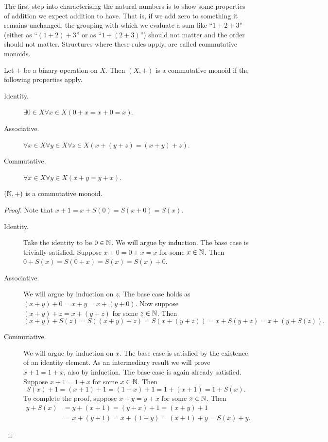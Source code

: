 \documentclass[../main.tex]{subfiles}
\begin{document}
The first step into characterising the natural numbers is to show some properties of addition we expect addition to have. That is, if we add zero to something it remains unchanged, the grouping with which we evaluate a sum like ``$1+2+3$'' (either as ``$(1+2)+3$'' or as ``$1+(2+3)$'') should not matter and the order should not matter. Structures where these rules apply, are called commutative monoids.
\begin{definition}
    Let $+$ be a binary operation on $X$. Then $(X,+)$ is a commutative monoid if the following properties apply.
    \begin{description}
        \item[Identity.] $\exists0\in X\forall x\in X(0+x=x+0=x)$.
        \item[Associative.] $\forall x\in X\forall y\in X\forall z\in X(x+(y+z)=(x+y)+z)$.
        \item[Commutative.] $\forall x\in X\forall y\in X(x+y=y+x)$.
    \end{description}
\end{definition}
\begin{proposition}\label{prp:the_natural_numbers_integers_and_rational_numbers:commutative_monoid_natural_numbers}
    $(\mathbb{N},+)$ is a commutative monoid.
\end{proposition}
\begin{proof}
    Note that $x+1=x+S(0)=S(x+0)=S(x)$.
    \begin{description}
        \item[Identity.] Take the identity to be $0\in\mathbb{N}$. We will argue by induction. The base case is trivially satisfied. Suppose $x+0=0+x=x$ for some $x\in\mathbb{N}$. Then $0+S(x)=S(0+x)=S(x)=S(x)+0$.
        \item[Associative.] We will argue by induction on $z$. The base case holds as $(x+y)+0=x+y=x+(y+0)$. Now suppose $(x+y)+z=x+(y+z)$ for some $z\in\mathbb{N}$. Then
        \begin{equation*}
            (x+y)+S(z)=S((x+y)+z)=S(x+(y+z))=x+S(y+z)=x+(y+S(z)).
        \end{equation*}
        \item[Commutative.] We will argue by induction on $x$. The base case is satisfied by the existence of an identity element. As an intermediary result we will prove $x+1=1+x$, also by induction. The base case is again already satisfied. Suppose $x+1=1+x$ for some $x\in\mathbb{N}$. Then
        \begin{equation*}
            S(x)+1=(x+1)+1=(1+x)+1=1+(x+1)=1+S(x).
        \end{equation*}
        To complete the proof, suppose $x+y=y+x$ for some $x\in\mathbb{N}$. Then
        \begin{align*}
            y+S(x) & =y+(x+1)=(y+x)+1=(x+y)+1 \\
            & =x+(y+1)=x+(1+y)=(x+1)+y=S(x)+y.
        \end{align*}
    \end{description}
\end{proof}
\end{document}
